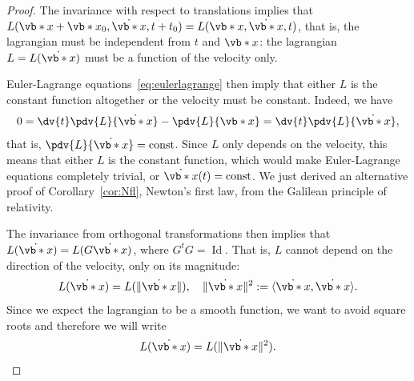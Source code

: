 \documentclass[english,fontsize=11pt,paper=b5]{scrbook}
\numberwithin{equation}{chapter}
\DeclareMathOperator{\Id}{Id}
\DeclareMathOperator{\Id}{Id}
\theoremstyle{definition}
\begin{document}
    \begin{proof}
      The invariance with respect to translations implies that $L(\vb*{x} + \vb*{x}_0, \dot{\vb*{x}}, t + t_0) = L(\vb*{x}, \dot{\vb*{x}}, t)$, that is, the lagrangian must be independent from $t$ and $\vb*{x}$: the lagrangian $L = L(\dot{\vb*{x}})$ must be a function of the velocity only.

      Euler-Lagrange equations~\eqref{eq:eulerlagrange} then imply that either $L$ is the constant function altogether or the velocity must be constant. Indeed, we have
      \begin{equation}
      0 = \dv{t}\pdv{L}{\dot{\vb*{x}}} - \pdv{L}{\vb*{x}} = \dv{t}\pdv{L}{\dot{\vb*{x}}},
      \end{equation}
      that is, $\pdv{L}{\dot{\vb*{x}}} = \mathrm{const}$. Since $L$ only depends on the velocity, this means that either $L$ is the constant function, which would make Euler-Lagrange equations completely trivial, or $\dot{\vb*{x}}(t) = \mathrm{const}$.
      We just derived an alternative proof of Corollary~\ref{cor:Nfl}, Newton's first law, from the Galilean principle of relativity.

      The invariance from orthogonal transformations then implies that $L(\dot{\vb*{x}}) = L(G\dot{\vb*{x}})$, where $G^t G = \Id$. That is, $L$ cannot depend on the direction of the velocity, only on its magnitude:
      \begin{equation}
        L(\dot{\vb*{x}}) = L(\|\dot{\vb*{x}}\|), \quad \|\dot{\vb*{x}}\|^2 := \langle\dot{\vb*{x}}, \dot{\vb*{x}}\rangle.
      \end{equation}
      Since we expect the lagrangian to be a smooth function, we want to avoid square roots and therefore we will write
      \begin{equation}
        L(\dot{\vb*{x}}) = L(\|\dot{\vb*{x}}\|^2).
      \end{equation}


\end{proof}
\end{document}
